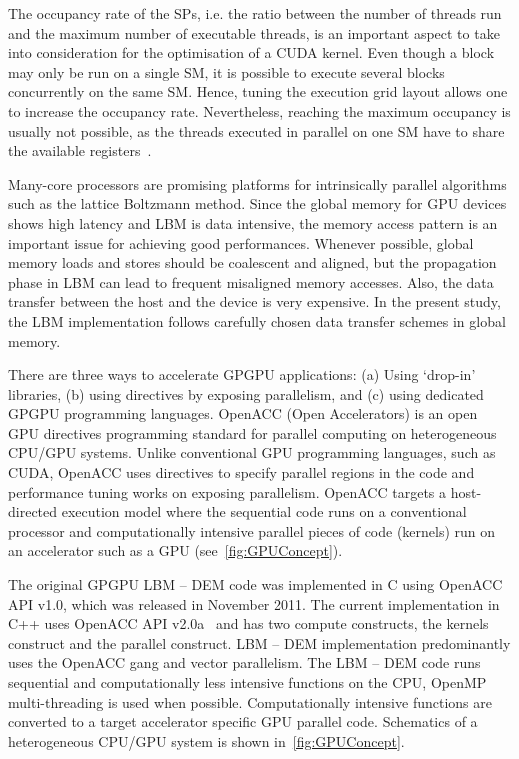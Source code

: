 The occupancy rate of the SPs, i.e. the ratio between the 
number of threads run and the maximum number of executable threads, is an 
important aspect to take into consideration for the optimisation of a CUDA 
kernel. Even though a block may only be run on a single SM, it is possible to 
execute several blocks concurrently on the same SM. Hence, tuning the execution 
grid layout allows one to increase the occupancy rate. Nevertheless, reaching 
the maximum occupancy is usually not possible, as the threads executed in 
parallel on one SM have to share the available registers~\citep{Obrecht2011}.

Many-core processors are promising platforms for intrinsically parallel 
algorithms such as the lattice Boltzmann method. Since the global memory 
for GPU devices shows high latency and LBM is data intensive, the
memory access pattern is an important issue for achieving good performances. 
Whenever possible, global memory loads and stores should be coalescent and 
aligned, but the propagation phase in LBM can lead to frequent misaligned 
memory accesses. Also, the data transfer between the host and the device is 
very expensive. In the present study, the LBM implementation follows carefully 
chosen data transfer schemes in global memory.

There are three ways to accelerate GPGPU applications: (a) Using `drop-in' 
libraries, (b) using directives by exposing parallelism, and (c) using 
dedicated GPGPU programming languages. OpenACC (Open Accelerators) is an open 
GPU directives programming standard for parallel computing on heterogeneous 
CPU/GPU systems. Unlike conventional GPU programming languages, such as CUDA, 
OpenACC uses directives to specify parallel regions in the code and performance 
tuning works on exposing parallelism. OpenACC targets a host-directed execution 
model where the sequential code runs on a conventional processor and 
computationally intensive parallel pieces of code (kernels) run on an 
accelerator such as a GPU (see~\cref{fig:GPUConcept}). 

The original GPGPU LBM -- DEM code was implemented in C using OpenACC API v1.0, 
which was released in November 2011. The current implementation in C++ uses 
OpenACC API v2.0a~\citep{OpenACCmembers2013} and has two compute 
constructs, the kernels construct and the parallel construct. LBM -- DEM 
implementation predominantly uses the OpenACC gang and vector parallelism. The 
LBM -- DEM code runs sequential and computationally less intensive 
functions on the CPU, OpenMP multi-threading is used when possible. 
Computationally intensive functions are converted to a target accelerator 
specific GPU parallel code. Schematics of a heterogeneous CPU/GPU system is 
shown in~\cref{fig:GPUConcept}.

